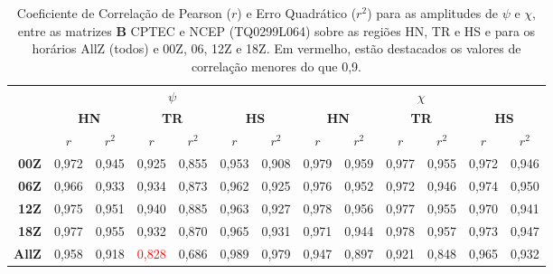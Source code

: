 \begin{table}[H]
\caption{Coeficiente de Correlação de Pearson ($r$) e Erro Quadrático ($r^{2}$) para as amplitudes de $\psi$ e $\chi$, entre as matrizes $\mathbf{B}$ CPTEC e NCEP (TQ0299L064) sobre as regiões HN, TR e HS e para os horários AllZ (todos) e 00Z, 06, 12Z e 18Z. Em vermelho, estão destacados os valores de correlação menores do que 0,9.}
\begin{center}
\begin{adjustbox}{max width=\textwidth}
\begin{tabular}{rcccccccccccc}
\toprule
\toprule
        & \multicolumn{6}{c}{$\psi$} & \multicolumn{6}{c}{$\chi$} \\
\cmidrule(lr{.75em}){2-7} \cmidrule(lr{.75em}){8-13}
        & \multicolumn{2}{c}{\textbf{HN}} & \multicolumn{2}{c}{\textbf{TR}} & \multicolumn{2}{c}{\textbf{HS}} & \multicolumn{2}{c}{\textbf{HN}} & \multicolumn{2}{c}{\textbf{TR}} & \multicolumn{2}{c}{\textbf{HS}} \\ 
\cmidrule(lr{.75em}){2-3} \cmidrule(lr{.75em}){4-5} \cmidrule(lr{.75em}){6-7} \cmidrule(lr{.75em}){8-9} \cmidrule(lr{.75em}){10-11} \cmidrule(lr{.75em}){12-13}   
           & $r$ & $r^{2}$ & $r$ & $r^{2}$ & $r$ & $r^{2}$ & $r$ & $r^{2}$ & $r$ & $r^{2}$ & $r$ & $r^{2}$\\ 
\midrule
\textbf{00Z}  & 0,972 & 0,945 & 0,925 & 0,855 & 0,953 & 0,908 & 0,979 & 0,959 & 0,977 & 0,955 & 0,972 & 0,946 \\
\textbf{06Z}  & 0,966 & 0,933 & 0,934 & 0,873 & 0,962 & 0,925 & 0,976 & 0,952 & 0,972 & 0,946 & 0,974 & 0,950 \\
\textbf{12Z}  & 0,975 & 0,951 & 0,940 & 0,885 & 0,963 & 0,927 & 0,978 & 0,956 & 0,977 & 0,955 & 0,970 & 0,941 \\
\textbf{18Z}  & 0,977 & 0,955 & 0,932 & 0,870 & 0,965 & 0,931 & 0,971 & 0,944 & 0,978 & 0,957 & 0,973 & 0,947 \\
\textbf{AllZ} & 0,958 & 0,918 & \textcolor{red}{0,828} & 0,686 & 0,989 & 0,979 & 0,947 & 0,897 & 0,921 & 0,848 & 0,965 & 0,932 \\
\bottomrule     
\end{tabular}
\end{adjustbox}
\end{center}
\label{tab:disper_vals_BcptecXncep-sfvp}
\end{table}


